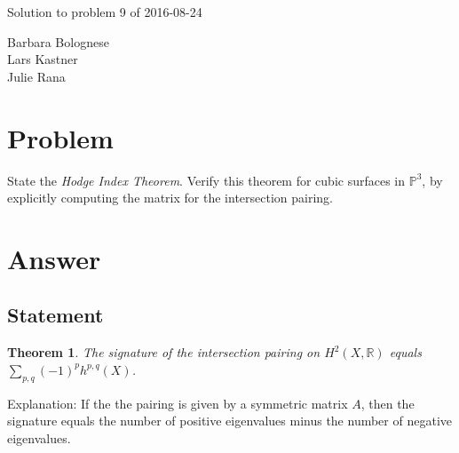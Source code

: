 \documentclass[a4paper, DIV=12]{scrreprt}
\newcommand{\PP}{{\mathbb P}}
\newcommand{\RR}{{\mathbb R}}
\newtheorem*{theorem}{Theorem}
\begin{document}
\begin{center}
\LARGE{Solution to problem 9 of 2016-08-24}

\vspace{.5cm}

\large{Barbara Bolognese\\Lars Kastner\\Julie Rana}
\end{center}


\section*{Problem}
State the \textit{Hodge Index Theorem}. Verify this theorem for cubic surfaces
in $\PP^3$, by explicitly computing the matrix for the intersection pairing.


\section*{Answer}

\subsection*{Statement}
\begin{theorem}
The signature of the intersection pairing on $H^2(X,\RR)$ equals $\sum_{p,q}(-1)^ph^{p,q}(X)$.
\end{theorem}

Explanation: If the the pairing is given by a symmetric matrix $A$, then the
signature equals the number of positive eigenvalues minus the number of
negative eigenvalues.
\end{document}
